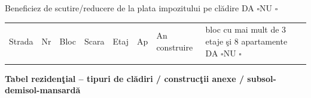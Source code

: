 \documentclass[8pt,a4paper,landscape]{extarticle}
\newcommand{\fillline}[1][6cm]{\underline{\hspace{#1}}}
\newcommand{\checkboxempty}{$\square$}
\begin{document}
Beneficiez de scutire/reducere de la plata impozitului pe clădire \quad DA \checkboxempty \quad NU \checkboxempty

\begin{tabularx}{\textwidth}{|X|X|X|X|X|X|X|X|}
\hline
Strada & Nr & Bloc & Scara & Etaj & Ap & An construire & bloc cu mai mult de 3 etaje şi 8 apartamente DA \checkboxempty \quad NU \checkboxempty \\
\fillline[3cm] & \fillline[1cm] & \fillline[1cm] & \fillline[1cm] & \fillline[1cm] & \fillline[1cm] & \fillline[2cm] & \\
\hline
\end{tabularx}

\vspace{0.15cm}

\textbf{Tabel rezidenţial -- tipuri de clădiri / construcţii anexe / subsol-demisol-mansardă}
\end{document}
